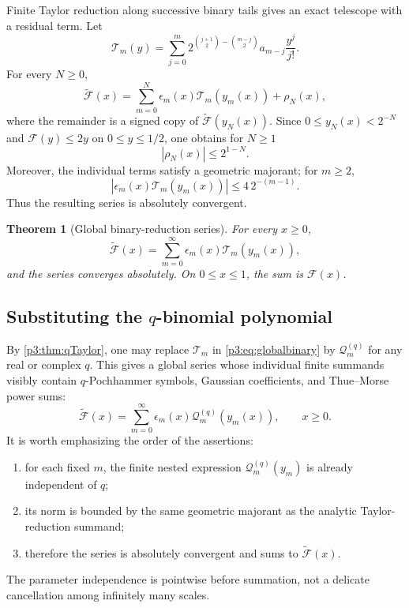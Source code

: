 \documentclass[11pt,oneside]{article}
\newtheorem{theorem}{Theorem}[section]
\theoremstyle{definition}
\theoremstyle{remark}
\newcommand{\F}{\mathcal F}
\newcommand{\G}{\widetilde{\mathcal F}}
\begin{document}
Finite Taylor reduction along successive binary tails gives an exact
telescope with a residual term.  Let
\begin{equation}\label{p3:eq:Tmdef}
 \mathcal T_m(y)=
 \sum_{j=0}^{m}
 2^{\binom{j+1}{2}-\binom{m-j}{2}}
 a_{m-j}\frac{y^j}{j!}.
\end{equation}
For every $N\ge0$,
\begin{equation}\label{p3:eq:finitetelescope}
 \G(x)=
 \sum_{m=0}^{N}\epsilon_m(x)\mathcal T_m(y_m(x))
 +\rho_N(x),
\end{equation}
where the remainder is a signed copy of $\G(y_N(x))$.  Since
$0\le y_N(x)<2^{-N}$ and $\F(y)\le2y$ on $0\le y\le1/2$, one obtains for
$N\ge1$
\begin{equation}\label{p3:eq:remainderbound}
 |\rho_N(x)|\le2^{1-N}.
\end{equation}
Moreover, the individual terms satisfy a geometric majorant; for $m\ge2$,
\begin{equation}\label{p3:eq:summandbound}
 \left|\epsilon_m(x)\mathcal T_m(y_m(x))\right|
 \le4\,2^{-(m-1)}.
\end{equation}
Thus the resulting series is absolutely convergent.

\begin{theorem}[Global binary-reduction series]\label{p3:thm:globalbinary}
For every $x\ge0$,
\begin{equation}\label{p3:eq:globalbinary}
 \boxed{
 \G(x)=\sum_{m=0}^{\infty}
 \epsilon_m(x)\mathcal T_m(y_m(x)),}
\end{equation}
and the series converges absolutely.  On $0\le x\le1$, the sum is
$\F(x)$.
\end{theorem}

\subsection{Substituting the \texorpdfstring{$q$-binomial polynomial}{q-binomial polynomial}}

By \cref{p3:thm:qTaylor}, one may replace $\mathcal T_m$ in
\eqref{p3:eq:globalbinary} by $\mathcal Q_m^{(q)}$ for any real or complex
$q$.  This gives a global series whose individual finite summands visibly
contain $q$-Pochhammer symbols, Gaussian coefficients, and Thue--Morse power
sums:
\begin{equation}\label{p3:eq:globalqcompact}
 \boxed{
 \G(x)=\sum_{m=0}^{\infty}
 \epsilon_m(x)\mathcal Q_m^{(q)}(y_m(x)),
 \qquad x\ge0.}
\end{equation}
It is worth emphasizing the order of the assertions:
\begin{enumerate}[leftmargin=2.2em]
\item for each fixed $m$, the finite nested expression
$\mathcal Q_m^{(q)}(y_m)$ is already independent of $q$;
\item its norm is bounded by the same geometric majorant as the analytic
Taylor-reduction summand;
\item therefore the series is absolutely convergent and sums to $\G(x)$.
\end{enumerate}
The parameter independence is pointwise before summation, not a delicate
cancellation among infinitely many scales.
\end{document}
